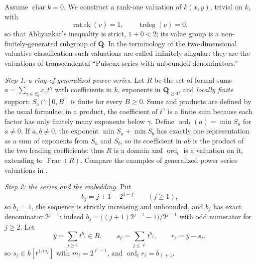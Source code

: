 \begin{example}
\label{ex:gallery-infsingular}
Assume $\operatorname{char}k=0$. We construct a rank-one valuation of
$k(x,y)$, trivial on $k$, with
\[
 \operatorname{rat.rk}(v)=1,
 \qquad
 \operatorname{trdeg}(v)=0,
\]
so that Abhyankar's inequality is strict, $1+0<2$; its value group is a
non-finitely-generated subgroup of $\mathbf Q$. In the terminology of the
two-dimensional valuative classification such valuations are called
infinitely singular: they are the valuations of transcendental
``Puiseux series with unbounded denominators.''

\emph{Step 1: a ring of generalized power series.} Let $R$ be the set of
formal sums $a=\sum_{\gamma\in S_a}c_\gamma t^\gamma$ with coefficients
in $k$, exponents in $\mathbf Q_{\geq0}$, and \emph{locally finite}
support: $S_a\cap[0,B]$ is finite for every $B\geq0$. Sums and products are defined by the usual formulae; in a
product, the coefficient of $t^\gamma$ is a finite sum because each
factor has only finitely many exponents below $\gamma$. Define
$\operatorname{ord}_t(a)=\min S_a$ for $a\neq0$. If $a,b\neq0$, the
exponent $\min S_a+\min S_b$ has exactly one representation as a sum of
exponents from $S_a$ and $S_b$, so its coefficient in $ab$ is the product
of the two leading coefficients: thus $R$ is a domain and
$\operatorname{ord}_t$ is a valuation on it, extending to
$\operatorname{Frac}(R)$. Compare the examples of generalized power
series valuations in \cite[Chapter~VI]{ZariskiSamuelII}.

\emph{Step 2: the series and the embedding.} Put
\[
 b_j=j+1-2^{1-j}\qquad(j\geq1),
\]
so $b_1=1$, the sequence is strictly increasing and unbounded, and $b_j$
has exact denominator $2^{j-1}$: indeed
$b_j=\bigl((j+1)2^{j-1}-1\bigr)/2^{j-1}$ with odd numerator for
$j\geq2$. Let
\[
 \hat y=\sum_{j\geq1}t^{b_j}\in R,
 \qquad
 s_\ell=\sum_{j\leq\ell}t^{b_j},
 \qquad
 r_\ell=\hat y-s_\ell ,
\]
so $s_\ell\in k[t^{1/m_\ell}]$ with $m_\ell=2^{\ell-1}$, and
$\operatorname{ord}_t r_\ell=b_{\ell+1}$.


\end{example}
